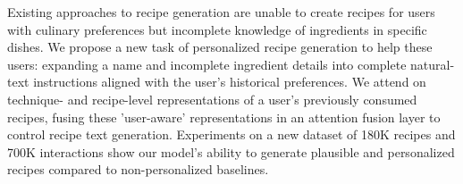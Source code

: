 Existing approaches to recipe generation are unable to create recipes for users with culinary preferences but incomplete knowledge of ingredients in specific dishes. We propose a new task of personalized recipe generation to help these users: expanding a name and incomplete ingredient details into complete natural-text instructions aligned with the user's historical preferences. We attend on technique- and recipe-level representations of a user's previously consumed recipes, fusing these 'user-aware' representations in an attention fusion layer to control recipe text generation. Experiments on a new dataset of 180K recipes and 700K interactions show our model's ability to generate plausible and personalized recipes compared to non-personalized baselines.